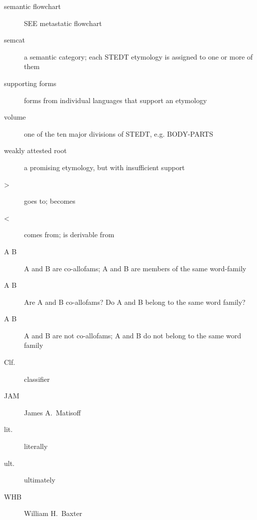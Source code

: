 \begin{multicols}{2}
\begin{description}
\item[semantic flowchart]	SEE metastatic flowchart
\item[semcat]	a semantic category; each STEDT etymology is assigned to one or more of them
\item[supporting forms]	forms from individual languages that support an etymology
\item[volume]	one of the ten major divisions of STEDT, e.g. BODY-PARTS
\item[weakly attested root]	a promising etymology, but with insufficient support
\item[>]	goes to; becomes
\item[<]	comes from; is derivable from
\item[A  B]	A and B are co-allofams; A and B are members of the same word-family
\item[A  B]	Are A and B co-allofams? Do A and B belong to the same word family?
\item[A  B]	A and B are not co-allofams; A and B do not belong to the same word family
\item[Clf.]	classifier
\item[JAM]	James A.\ Matisoff
\item[lit.]	literally
\item[ult.]	ultimately
\item[WHB]	William H.\ Baxter
\end{description}
\end{multicols}
